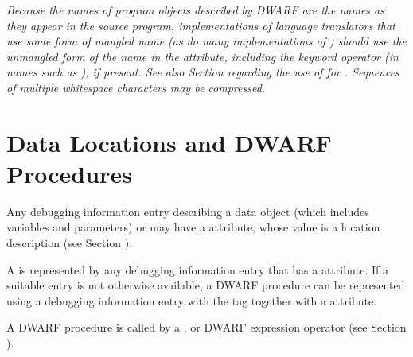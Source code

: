 \textit{Because the names of program objects described by DWARF are 
the names as they appear in the source program, implementations
of language translators that use some form of mangled name
(as do many implementations of ) should use the 
unmangled form of the name in the 
\DWATname{} attribute,
including the keyword operator (in names such as ),
if present. See also 
Section  regarding the use of 
\DWATlinkagename{} for 
.
Sequences of multiple whitespace characters may be compressed.}

\section{Data Locations and DWARF Procedures}
\hypertarget{chap:DWATlocationdataobjectlocation}{}
Any debugging information entry describing a data object (which
includes variables and parameters) or 
may have a \DWATlocationDEFN{} attribute,
whose value is a location description
(see Section ).

A 
is represented by any
\bb\eb
debugging information entry that has a
\DWATlocationNAME{}
attribute. 
If a suitable entry is not otherwise available,
a DWARF procedure can be represented using a debugging
information entry with the 
tag \DWTAGdwarfprocedureTARG{}
together with 
a \DWATlocationNAME{} attribute.  

A DWARF procedure
is called by a \DWOPcalltwo, 
\DWOPcallfour{} or 
\DWOPcallref{}
DWARF expression operator 
(see Section ).

\bb
